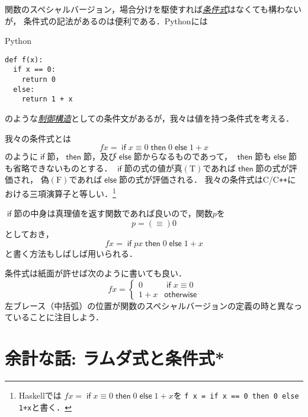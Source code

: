 \documentclass[a5paper,draft]{jsbook}
\newcommand{\programminglanguage}[1]{\textsf{#1}}
\newcommand{\clang}{\programminglanguage{C}}
\newcommand{\cxx}{\programminglanguage{C}\texttt{++}}
\newcommand{\haskell}{\programminglanguage{Haskell}}
\newcommand{\python}{\programminglanguage{Python}}
\newcommand{\keyword}[1]{{\underline{\emph{#1}}}}
\newcommand{\code}[1]{\texttt{#1}}
\newenvironment{pythoncode}{\begin{itembox}[r]{\python}}{\end{itembox}}
\newcommand{\pthnId}[1]{{DO NOT USE}--\textit{#1}}
\newcommand{\pthnKeyword}[1]{{DO NOT USE}--\textbf{#1}}
\newcommand{\pthnOp}[1]{{DO NOT USE}--\texttt{#1}}
\newcommand{\mathConstant}[1]{\mathrm{#1}} %
\newcommand{\mathTrue}{\mathConstant{T}}
\newcommand{\mathFalse}{\mathConstant{F}}
\newcommand{\mathKeyword}[1]{\operatorname{\textsf{#1}}}
\newcommand{\mathIf}{\mathKeyword{if}}
\newcommand{\mathThen}{\mathKeyword{then}}
\newcommand{\mathElse}{\mathKeyword{else}}
\newcommand{\mathOtherwise}{\mathKeyword{otherwise}}
\begin{document}
関数のスペシャルバージョン，場合分けを駆使すれば\keyword{条件式}はなくても構わないが，
条件式の記法があるのは便利である．\python には
\begin{pythoncode}
\begin{verbatim}
def f(x):
  if x == 0:
    return 0
  else:
    return 1 + x
\end{verbatim}
\end{pythoncode}
のような\keyword{制御構造}としての条件文があるが，我々は値を持つ条件式を考える．

我々の条件式とは
\begin{equation}
fx=\mathIf x\equiv0\mathThen0\mathElse1+x
\end{equation}
のように$\mathIf$節，$\mathThen$節，及び$\mathElse$節からなるものであって，
$\mathThen$節も$\mathElse$節も省略できないものとする．
$\mathIf$節の式の値が真$(\mathTrue)$であれば$\mathThen$節の式が評価され，
偽$(\mathFalse)$であれば$\mathElse$節の式が評価される．
我々の条件式は\clang/\cxx における三項演算子と等しい．\footnote{\haskell では
$fx=\mathIf x\equiv0\mathThen0\mathElse1+x$を
\code{f x = if x == 0 then 0 else 1+x}と書く．}

$\mathIf$節の中身は真理値を返す関数であれば良いので，関数$p$を
\begin{equation}
p=(\equiv)0
\end{equation}
としておき，
\begin{equation}
fx=\mathIf px\mathThen0\mathElse1+x
\end{equation}
と書く方法もしばしば用いられる．

条件式は紙面が許せば次のように書いても良い．
\begin{equation}
fx=\begin{cases}
0&\mathIf x\equiv0\\
1+x&\mathOtherwise
\end{cases}
\end{equation}
左ブレース（中括弧）の位置が関数のスペシャルバージョンの定義の時と異なっていることに注目しよう．

\section{余計な話: ラムダ式と条件式*}
\end{document}
